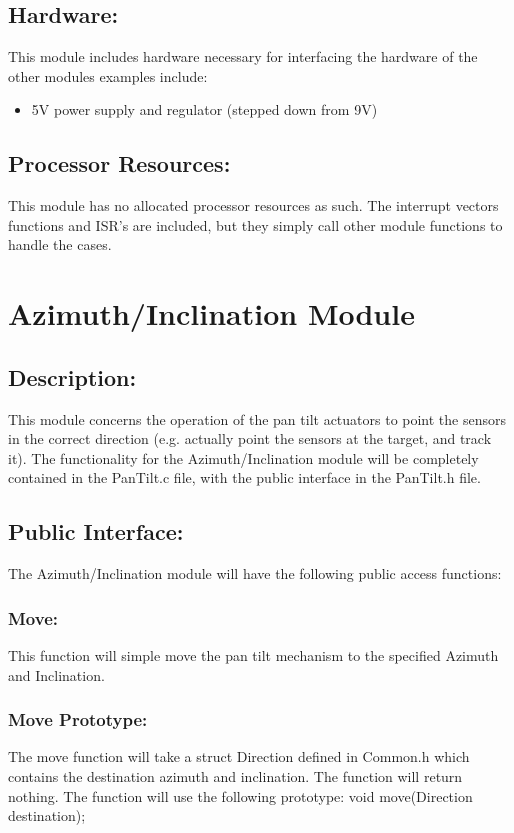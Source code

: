 \documentclass[]{article}
\begin{document}
\subsection{Hardware:}
This module includes hardware necessary for interfacing the hardware of the other modules examples include:
\begin{itemize}
	\item 5V power supply and regulator (stepped down from 9V)
\end{itemize}

\subsection{Processor Resources:}
This module has no allocated processor resources as such. The interrupt vectors functions and ISR's are included, but they simply call other module functions to handle the cases.

\newpage
\section{Azimuth/Inclination Module}

\subsection{Description:}
This module concerns the operation of the pan tilt actuators to point the sensors in the correct direction (e.g. actually point the sensors at the target, and track it). The functionality for the Azimuth/Inclination module will be completely contained in the PanTilt.c file, with the public interface in the PanTilt.h file.

\subsection{Public Interface:}
The Azimuth/Inclination module will have the following public access functions:

\subsubsection{Move:}
This function will simple move the pan tilt mechanism to the specified Azimuth and Inclination.

\subsubsection{Move Prototype:}
The move function will take a struct Direction defined in Common.h which contains the destination azimuth and inclination. The function will return nothing. The function will use the following prototype: \newline \newline 
void move(Direction destination);
\end{document}
